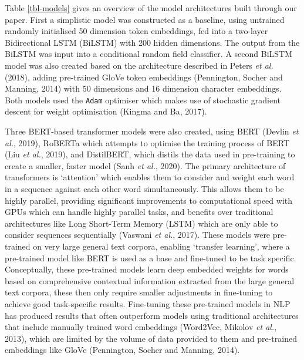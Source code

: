 \documentclass[
  letterpaper,
  11pt,
  english,
  onehalfspacing,
  headsepline]{MastersDoctoralThesis}
\begin{document}
Table \ref{tbl-models} gives an overview of the model architectures
built through our paper. First a simplistic model was constructed as a
baseline, using untrained randomly initialised 50 dimension token
embeddings, fed into a two-layer Bidirectional LSTM (BiLSTM) with 200
hidden dimensions. The output from the BiLSTM was input into a
conditional random field classifier. A second BiLSTM model was also
created based on the architecture described in Peters \emph{et al.}
(2018), adding pre-trained GloVe token embeddings (Pennington, Socher
and Manning, 2014) with 50 dimensions and 16 dimension character
embeddings. Both models used the \texttt{Adam} optimiser which makes use
of stochastic gradient descent for weight optimisation (Kingma and Ba,
2017).

Three BERT-based transformer models were also created, using BERT
(Devlin \emph{et al.}, 2019), RoBERTa which attempts to optimise the
training process of BERT (Liu \emph{et al.}, 2019), and DistilBERT,
which distils the data used in pre-training to create a smaller, faster
model (Sanh \emph{et al.}, 2020). The primary architecture of
transformers is `attention' which enables them to consider and weight
each word in a sequence against each other word simultaneously. This
allows them to be highly parallel, providing significant improvements to
computational speed with GPUs which can handle highly parallel tasks,
and benefits over traditional architectures like Long Short-Term Memory
(LSTM) which are only able to consider sequences sequentially (Vaswani
\emph{et al.}, 2017). These models were pre-trained on very large
general text corpora, enabling `transfer learning', where a pre-trained
model like BERT is used as a base and fine-tuned to be task specific.
Conceptually, these pre-trained models learn deep embedded weights for
words based on comprehensive contextual information extracted from the
large general text corpora, these then only require smaller adjustments
in fine-tuning to achieve good task-specific results. Fine-tuning these
pre-trained models in NLP has produced results that often outperform
models using traditional architectures that include manually trained
word embeddings (Word2Vec, Mikolov \emph{et al.}, 2013), which are
limited by the volume of data provided to them and pre-trained
embeddings like GloVe (Pennington, Socher and Manning, 2014).
\end{document}
